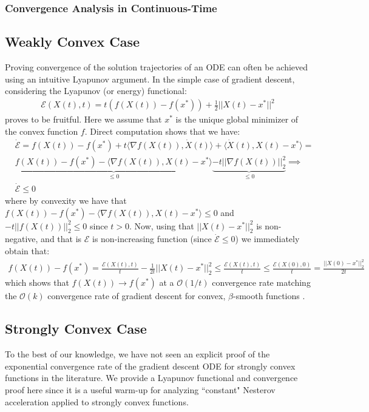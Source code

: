 \subsubsection{Convergence Analysis in Continuous-Time}
\subsection{Weakly Convex Case}
Proving convergence of the solution trajectories of an ODE can often be achieved using an intuitive Lyapunov argument. In the simple case of gradient descent, considering the Lyapunov (or energy) functional:
\begin{align*}
    \mathcal{E}(X(t), t) = t (f(X(t)) - f(x^*)) + \frac{1}{2}||X(t)-x^*||^2
\end{align*}
proves to be fruitful. Here we assume that $x^*$ is the unique global minimizer of the convex function $f$. Direct computation shows that we have:
\begin{align*}
    & \dot{\mathcal{E}}= f(X(t)) - f(x^*) + t \langle \nabla f(X(t)), \dot{X}(t) \rangle + \langle \dot{X}(t), X(t)-x^* \rangle = \\
    & \underbrace{f(X(t)) - f(x^*) - \langle \nabla f(X(t)), X(t) - x^* \rangle}_{\leq 0} \underbrace{- t || \nabla f(X(t))||_2^2}_{\leq 0} \implies \\
    & \dot{\mathcal{E}} \leq 0
\end{align*}
where by convexity we have that $f(X(t)) - f(x^*) - \langle \nabla f(X(t)), X(t) - x^* \rangle \leq 0$ and $ - t ||f(X(t))||_2^2 \leq 0$ since $t>0$. Now, using that $||X(t)-x^*||_2^2$ is non-negative, and that is $\mathcal{E}$ is non-increasing function (since $\dot{\mathcal{E}} \leq 0$) we immediately obtain that:
\begin{align*}
    f(X(t)) - f(x^*) = \frac{\mathcal{E}(X(t), t)}{t} - \frac{1}{2t} ||X(t) - x^*||_2^2 \leq \frac{\mathcal{E}(X(t), t)}{t} \leq \frac{\mathcal{E}(X(0), 0)}{t} = \frac{||X(0)-x^*||_2^2}{2t}
\end{align*}
which shows that $f(X(t)) \to f(x^*)$ at a $\mathcal{O}(1/t)$ convergence rate matching the $\mathcal{O}(k)$ convergence rate of gradient descent for convex, $\beta$-smooth functions \cite{DBLP:journals/ftml/Bubeck15}.

\subsection{Strongly Convex Case}
To the best of our knowledge, we have not seen an  explicit proof of the exponential convergence rate of the gradient descent ODE for strongly convex functions in the literature. We provide a Lyapunov functional and convergence proof here since it is a useful warm-up for analyzing ``constant" Nesterov acceleration applied to strongly convex functions.

